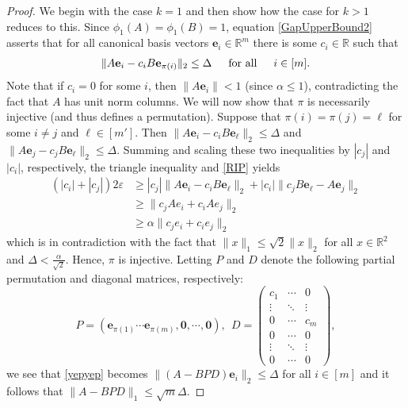 \documentclass[journal, onecolumn]{IEEEtran}
\begin{document}
\begin{proof}
We begin with the case $k=1$ and then show how the case for $k>1$ reduces to this. Since $\phi_1(A) = \phi_1(B) = 1$, equation \eqref{GapUpperBound2} asserts that for all canonical basis vectors $\mathbf{e}_i \in \mathbb{R}^m$ there is some $c_i \in \mathbb{R}$ such that 
\begin{align}\label{yepyep}
\|A\mathbf{e}_i - c_iB\mathbf{e}_{\pi(i)}\|_2 \leq \Delta \indent \text{for all} \indent i \in [m].
\end{align}
Note that if $c_i = 0$ for some $i$, then $\|A\mathbf{e}_i\| < 1$ (since $\alpha \leq 1$), contradicting the fact that $A$ has unit norm columns. We will now show that $\pi$ is necessarily injective (and thus defines a permutation). Suppose that $\pi(i) = \pi(j) = \ell$ for some $i \neq j$ and $\ell \in [m']$. Then $\|A\mathbf{e}_i - c_iB\mathbf{e}_{\ell}\|_2  \leq \Delta$ and $\|A\mathbf{e}_j - c_jB\mathbf{e}_{\ell}\|_2 \leq \Delta$. Summing and scaling these two inequalities by $|c_j|$ and $|c_i|$, respectively, the triangle inequality and \eqref{RIP} yields
\begin{align*}
(|c_i| + |c_j|) 2\varepsilon
&\geq |c_j|\|A\mathbf{e}_i - c_iB\mathbf{e}_{\ell}\|_2 + |c_i|\|c_jB\mathbf{e}_{\ell} - A\mathbf{e}_j\|_2 \\
&\geq \|c_jAe_i + c_iAe_j\|_2 \\
&\geq \alpha\|c_je_i + c_ie_j\|_2
\end{align*}
%
which is in contradiction with the fact that $\|x\|_1 \leq \sqrt{2}\|x\|_2$ for all $x \in \mathbb{R}^2$ and $\Delta < \frac{\alpha}{\sqrt{2}}$. Hence, $\pi$ is injective. Letting $P$ and $D$ denote the following partial permutation and diagonal matrices, respectively:
\begin{equation}\label{PandD}
P = \left( \mathbf{e}_{\pi(1)} \cdots \mathbf{e}_{\pi(m)}, \mathbf{0}, \cdots, \mathbf{0} \right), \ \ D = \left(\begin{array}{ccc}c_1 & \cdots & 0 \\\vdots & \ddots & \vdots \\0 & \cdots & c_m \\ 0 & \cdots & 0 \\ \vdots & \ddots & \vdots \\ 0 & \cdots & 0
\end{array}\right),
\end{equation}
%
we see that \eqref{yepyep} becomes $\|(A - BPD)\mathbf{e}_i\|_2 \leq \Delta$ for all $i \in [m]$ and it follows that $\|A-BPD\|_1 \leq \sqrt{m}\Delta$.


\end{proof}
\end{document}
